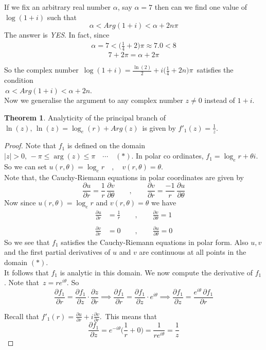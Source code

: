 \documentclass[11pt,a4paper]{article}
\theoremstyle{definition}
\newtheorem{thm}{Theorem}[section]
\begin{document}
If we fix an arbitrary real number $\alpha$, say $\alpha = 7$ then can we find one value of $\log(1 + i)$ such that $$\alpha < Arg(1 + i) < \alpha + 2n\pi$$
The answer is \textit{YES}. In fact, since
\begin{align*}
\alpha = 7 < \Big(\frac{1}{4} + 2\Big) \pi \approx 7.0 < 8
\end{align*}
$$7 + 2\pi = \alpha  + 2\pi$$

So the complex number $\,\log ( 1 + i) = \frac{\ln (2)}{2} + i\Big(\frac{1}{4} + 2n\Big)\pi\,$ satisfies the condition \\$\, \alpha < Arg(1 + i) < \alpha + 2n$.\\
Now we generalise the argument to any complex number $z \neq 0$ instead of $1 + i$.\\






\begin{thm}
Analyticity of the principal branch of $\ln (z),\,\boxed{\ln (z) = \log_e (r) +  Arg(z)}\,$ is given by $f'_1(z) = \frac{1}{z}$.
\end{thm}

\begin{proof}
Note that $f_1$ is defined on the domain $\left|z\right| > 0,\, -\pi \leq \operatorname{arg}(z) \leq \pi\quad  \cdots\quad (*)$. In polar co ordinates, $f_1 = \log_e r + \theta i$. So we can set $u(r,\theta) = \log_e r\quad ,\quad  v(r,\theta) = \theta$.\\
Note that, the Cauchy-Riemann equations in polar coordinates are given by $$\frac{\partial u}{\partial r} = \frac{1}{r}\,\frac{\partial v}{\partial \theta}\qquad ,\qquad  \frac{\partial v}{\partial r} = \frac{-1}{r}\,\frac{\partial u}{\partial \theta}$$
Now since $u(r,\theta) = \log_er$ and $v(r,\theta) = \theta$ we have 
\begin{align*}
\frac{\partial u}{\partial r} & = \frac{1}{r}\qquad ,\qquad  \frac{\partial v}{\partial \theta} = 1\\\\
\frac{\partial v}{\partial r} & = 0\qquad ,\qquad  \frac{\partial u}{\partial \theta} = 0
\end{align*}
So we see that $f_1$ satisfies the Cauchy-Riemann equations in polar form. Also $u, v$ and the first partial derivatives of $u$ and $v$ are continuous at all points in the domain $(*)$.\\
It follows that $f_1$ is analytic in this domain. We now compute the derivative of $f_1$. Note that $\, z = re^{i\theta}$. So $$\frac{\partial f_1}{\partial r}= \frac{\partial f_1}{\partial z}\cdot \frac{\partial z}{\partial r}\implies \frac{\partial f_1}{\partial r}=\frac{\partial f_1}{\partial z}\cdot e^{i\theta}\implies \frac{\partial f_1}{\partial z} = \frac{e^{i\theta}\,\partial f_1}{\partial r}$$

Recall that $f'_1(r) = \frac{\partial u}{\partial r} + i\frac{\partial v}{\partial r}.\,$ This means that $$\frac{\partial f_1}{\partial z} = e^{-i\theta}\Big(\frac{1}{r} + 0\Big) = \frac{1}{re^{i\theta}} = \frac{1}{z}$$
\end{proof}
\end{document}
